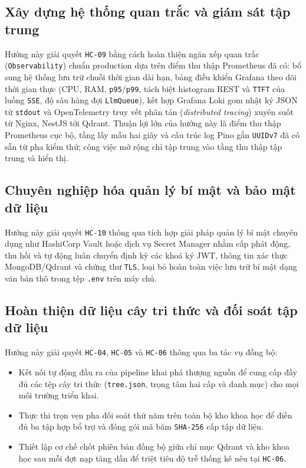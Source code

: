 \subsection{Xây dựng hệ thống quan trắc và giám sát tập trung}
\label{subsec:giam-sat-tap-trung}

Hướng này giải quyết \texttt{HC-09} bằng cách hoàn thiện ngăn xếp quan trắc (\texttt{Observability}) chuẩn production dựa trên điểm thu thập Prometheus đã có: bổ sung hệ thống lưu trữ chuỗi thời gian dài hạn, bảng điều khiển Grafana theo dõi thời gian thực (CPU, RAM, \texttt{p95}/\texttt{p99}, tách biệt histogram REST và \texttt{TTFT} của luồng \texttt{SSE}, độ sâu hàng đợi \texttt{LlmQueue}), kết hợp Grafana Loki gom nhật ký JSON từ \texttt{stdout} và OpenTelemetry truy vết phân tán (\textit{distributed tracing}) xuyên suốt từ Nginx, NestJS tới Qdrant. Thuận lợi lớn của hướng này là điểm thu thập Prometheus cục bộ, tầng lấy mẫu hai giây và cấu trúc log Pino gắn \texttt{UUIDv7} đã có sẵn từ pha kiểm thử; công việc mở rộng chỉ tập trung vào tầng thu thập tập trung và hiển thị.

\subsection{Chuyên nghiệp hóa quản lý bí mật và bảo mật dữ liệu}
\label{subsec:quan-ly-bi-mat}

Hướng này giải quyết \texttt{HC-10} thông qua tích hợp giải pháp quản lý bí mật chuyên dụng như HashiCorp Vault hoặc dịch vụ Secret Manager nhằm cấp phát động, thu hồi và tự động luân chuyển định kỳ các khoá ký JWT, thông tin xác thực MongoDB/Qdrant và chứng thư \texttt{TLS}, loại bỏ hoàn toàn việc lưu trữ bí mật dạng văn bản thô trong tệp \texttt{.env} trên máy chủ.

\subsection{Hoàn thiện dữ liệu cây tri thức và đối soát tập dữ liệu}
\label{subsec:hoan-thien-du-lieu}

Hướng này giải quyết \texttt{HC-04}, \texttt{HC-05} và \texttt{HC-06} thông qua ba tác vụ đồng bộ:

\begin{itemize}
\item[--] Kết nối tự động đầu ra của pipeline khai phá thượng nguồn để cung cấp đầy đủ các tệp cây tri thức (\texttt{tree.json}, trọng tâm hai cấp và danh mục) cho mọi môi trường triển khai.
\item[--] Thực thi trọn vẹn pha đối soát thứ năm trên toàn bộ kho khoa học để điền đủ ba tập hợp bổ trợ và đóng gói mã băm \texttt{SHA-256} cấp tập dữ liệu.
\item[--] Thiết lập cơ chế chốt phiên bản đồng bộ giữa chỉ mục Qdrant và kho khoa học sau mỗi đợt nạp tăng dần để triệt tiêu độ trễ thống kê nêu tại \texttt{HC-06}.
\end{itemize}

